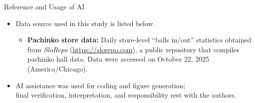 \documentclass{beamer}
\begin{document}
\begin{frame}{Reference and Usage of AI}
\begin{itemize}
    \item Data source used in this study is listed below.
    \begin{itemize}
        \item \textbf{Pachinko store data:} Daily store-level ``balls in/out'' statistics obtained from \emph{SloRepo} (\url{https://slorepo.com}), a public repository that compiles pachinko hall data. Data were accessed on October 22, 2025 (America/Chicago). 
    \end{itemize}

    \item AI assistance was used for coding and figure generation;\\
    final verification, interpretation, and responsibility rest with the authors.
\end{itemize}
\end{frame}
\end{document}
